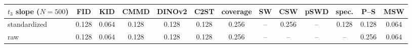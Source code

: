 \begin{tabular}{lcccccccccccc}
\toprule
$t_3$ slope ($N{=}500$) & FID & KID & CMMD & DINOv2 & C2ST & coverage & SW & CSW & pSWD & spec. & P--S & MSW \\
\midrule
standardized & 0.128 & $\mathbf{0.064}$ & 0.128 & 0.128 & 0.128 & 0.256 & -- & 0.256 & -- & 0.128 & 0.128 & $\mathbf{0.064}$ \\
raw & 0.128 & $\mathbf{0.064}$ & 0.128 & 0.128 & 0.128 & 0.256 & -- & -- & -- & -- & 0.256 & $\mathbf{0.064}$ \\
\bottomrule
\end{tabular}
